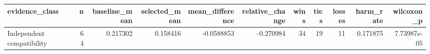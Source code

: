 \begin{tabular}{lrrrrrrrrrr}
\toprule
evidence_class & n & baseline_mean & selected_mean & mean_difference & relative_change & wins & ties & losses & harm_rate & wilcoxon_p \\
\midrule
Independent compatibility & 64 & 0.217302 & 0.158416 & -0.0588853 & -0.270984 & 34 & 19 & 11 & 0.171875 & 7.73987e-05 \\
\bottomrule
\end{tabular}

